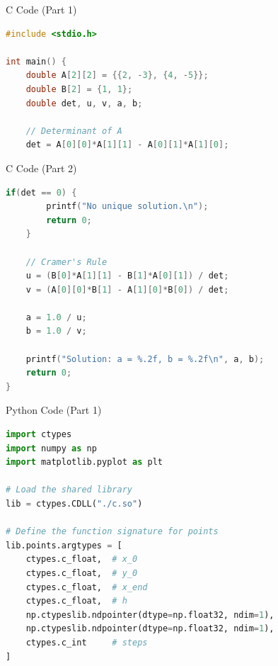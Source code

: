 \documentclass{beamer}
\begin{document}
\begin{frame}[fragile]{C Code (Part 1)}
\begin{lstlisting}[language=C]
#include <stdio.h>

int main() {
    double A[2][2] = {{2, -3}, {4, -5}};
    double B[2] = {1, 1};
    double det, u, v, a, b;

    // Determinant of A
    det = A[0][0]*A[1][1] - A[0][1]*A[1][0];
\end{lstlisting}
\end{frame}

\begin{frame}[fragile]{C Code (Part 2)}
\begin{lstlisting}[language=C]
    if(det == 0) {
        printf("No unique solution.\n");
        return 0;
    }

    // Cramer's Rule
    u = (B[0]*A[1][1] - B[1]*A[0][1]) / det;
    v = (A[0][0]*B[1] - A[1][0]*B[0]) / det;

    a = 1.0 / u;
    b = 1.0 / v;

    printf("Solution: a = %.2f, b = %.2f\n", a, b);
    return 0;
}
\end{lstlisting}
\end{frame}

\begin{frame}[fragile]{Python Code (Part 1)}
\begin{lstlisting}[language=Python]
import ctypes
import numpy as np
import matplotlib.pyplot as plt

# Load the shared library
lib = ctypes.CDLL("./c.so")

# Define the function signature for points
lib.points.argtypes = [
    ctypes.c_float,  # x_0
    ctypes.c_float,  # y_0
    ctypes.c_float,  # x_end
    ctypes.c_float,  # h
    np.ctypeslib.ndpointer(dtype=np.float32, ndim=1),  
    np.ctypeslib.ndpointer(dtype=np.float32, ndim=1),  
    ctypes.c_int     # steps
]
\end{lstlisting}
\end{frame}
\end{document}
